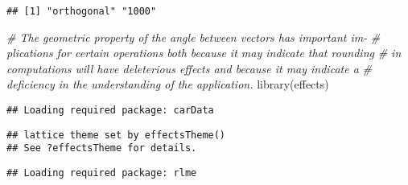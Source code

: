 \documentclass[
]{article}
\newenvironment{Shaded}{\begin{snugshade}}{\end{snugshade}}
\newcommand{\AttributeTok}[1]{\textcolor[rgb]{0.77,0.63,0.00}{#1}}
\newcommand{\CommentTok}[1]{\textcolor[rgb]{0.56,0.35,0.01}{\textit{#1}}}
\newcommand{\ConstantTok}[1]{\textcolor[rgb]{0.00,0.00,0.00}{#1}}
\newcommand{\ControlFlowTok}[1]{\textcolor[rgb]{0.13,0.29,0.53}{\textbf{#1}}}
\newcommand{\FunctionTok}[1]{\textcolor[rgb]{0.00,0.00,0.00}{#1}}
\newcommand{\NormalTok}[1]{#1}
\newcommand{\OtherTok}[1]{\textcolor[rgb]{0.56,0.35,0.01}{#1}}
\newcommand{\SpecialCharTok}[1]{\textcolor[rgb]{0.00,0.00,0.00}{#1}}
\newcommand{\StringTok}[1]{\textcolor[rgb]{0.31,0.60,0.02}{#1}}
\begin{document}
\begin{verbatim}
## [1] "orthogonal" "1000"
\end{verbatim}

\begin{Shaded}
\begin{Highlighting}[]
\CommentTok{\# The geometric property of the angle between vectors has important im{-}}
\CommentTok{\# plications for certain operations both because it may indicate that rounding}
\CommentTok{\# in computations will have deleterious eﬀects and because it may indicate a}
\CommentTok{\# deﬁciency in the understanding of the application.}
\FunctionTok{library}\NormalTok{(effects)}
\end{Highlighting}
\end{Shaded}

\begin{verbatim}
## Loading required package: carData
\end{verbatim}

\begin{verbatim}
## lattice theme set by effectsTheme()
## See ?effectsTheme for details.
\end{verbatim}

\begin{Shaded}
\end{Shaded}

\begin{verbatim}
## Loading required package: rlme
\end{verbatim}
\end{document}
